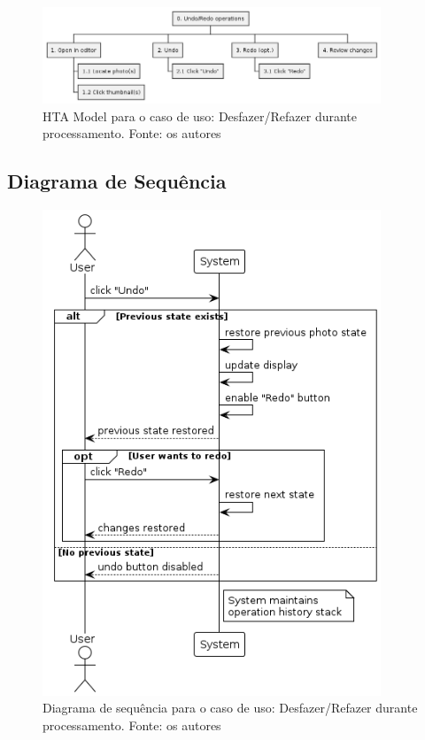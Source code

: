 \begin{figure}[H]
    \centering
    \includegraphics[width=0.9\textwidth]{../figures/hta/UC013.png}
    \caption{HTA Model para o caso de uso: Desfazer/Refazer durante processamento. Fonte: os autores}
    \label{fig:hta-uc013}
\end{figure}

\subsection{Diagrama de Sequência}

\begin{figure}[H]
    \centering
    \includegraphics[width=0.9\textwidth]{../figures/dss/UC013.png}
    \caption{Diagrama de sequência para o caso de uso: Desfazer/Refazer durante processamento. Fonte: os autores}
    \label{fig:dss-uc013}
\end{figure}

